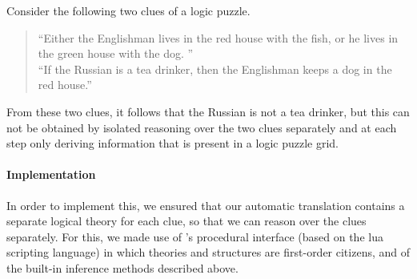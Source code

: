 \begin{example}
 Consider the following two clues of a logic puzzle. 
 \begin{quote}
  ``Either the Englishman lives in the red house with the fish, or he lives in the green house with the dog. '' \\
  ``If the Russian is a tea drinker, then the Englishman keeps a dog in the red house.'' 
 \end{quote}
From these two clues, it follows that the Russian is not a tea drinker, but this can not be obtained by isolated reasoning over the two clues separately and at each step only deriving information that is present in a logic puzzle grid.  
\end{example}

\paragraph{Implementation}
In order to implement this, we ensured that our automatic translation contains a separate logical theory for each clue, so that we can reason over the clues separately. For this, we made use of \idp's procedural interface (based on the lua scripting language) in which theories and structures are first-order citizens, and of the built-in inference methods described above. 
% 

